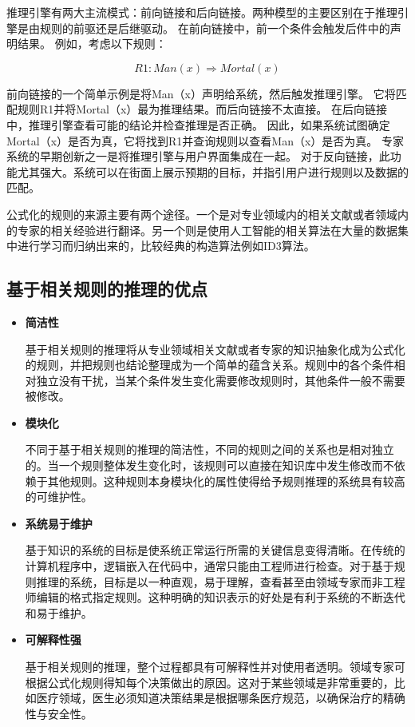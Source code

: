 推理引擎有两大主流模式：前向链接和后向链接。两种模型的主要区别在于推理引擎是由规则的前驱还是后继驱动。 在前向链接中，前一个条件会触发后件中的声明结果。 例如，考虑以下规则：

\begin{equation}
R1:Man(x) \Rightarrow Mortal(x)
\end{equation}

前向链接的一个简单示例是将Man（x）声明给系统，然后触发推理引擎。 它将匹配规则R1并将Mortal（x）最为推理结果。而后向链接不太直接。 在后向链接中，推理引擎查看可能的结论并检查推理是否正确。 因此，如果系统试图确定Mortal（x）是否为真，它将找到R1并查询规则以查看Man（x）是否为真。 专家系统的早期创新之一是将推理引擎与用户界面集成在一起。 对于反向链接，此功能尤其强大。系统可以在街面上展示预期的目标，并指引用户进行规则以及数据的匹配。

公式化的规则的来源主要有两个途径。一个是对专业领域内的相关文献或者领域内的专家的相关经验进行翻译。另一个则是使用人工智能的相关算法\cite{Mitchell1997Machine}在大量的数据集中进行学习而归纳出来的，比较经典的构造算法例如ID3算法\cite{Quinlan1986Induction}。

\subsection{基于相关规则的推理的优点}

\begin{itemize}

\item \textbf{简洁性}

基于相关规则的推理将从专业领域相关文献或者专家的知识抽象化成为公式化的规则，并把规则也结论整理成为一个简单的蕴含关系。规则中的各个条件相对独立没有干扰，当某个条件发生变化需要修改规则时，其他条件一般不需要被修改。

\item \textbf{模块化}

不同于基于相关规则的推理的简洁性，不同的规则之间的关系也是相对独立的。当一个规则整体发生变化时，该规则可以直接在知识库中发生修改而不依赖于其他规则。这种规则本身模块化的属性使得给予规则推理的系统具有较高的可维护性。

\item \textbf{系统易于维护}

基于知识的系统的目标是使系统正常运行所需的关键信息变得清晰。在传统的计算机程序中\cite{Biles1983Building}，逻辑嵌入在代码中，通常只能由工程师进行检查。对于基于规则推理的系统，目标是以一种直观，易于理解，查看甚至由领域专家而非工程师编辑的格式指定规则。这种明确的知识表示的好处是有利于系统的不断迭代和易于维护。

\item \textbf{可解释性强}

基于相关规则的推理，整个过程都具有可解释性并对使用者透明。领域专家可根据公式化规则得知每个决策做出的原因。这对于某些领域是非常重要的，比如医疗领域，医生必须知道决策结果是根据哪条医疗规范，以确保治疗的精确性与安全性。

\end{itemize}

